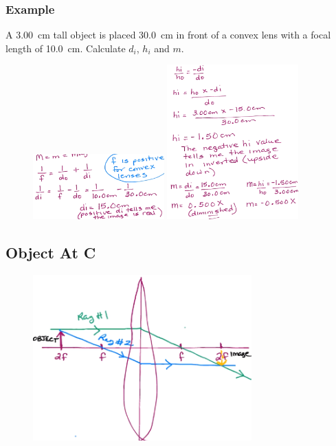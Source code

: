 \documentclass[a4paper,12pt]{article}
\begin{document}
\subsubsection{Example}
A \SI{3.00}{\cm} tall object is placed \SI{30.0}{\cm} in front of a convex lens with a focal length of \SI{10.0}{\cm}. Calculate $d_i$, $h_i$ and $m$.
\begin{figure}[H]
    \centering
    \includegraphics[width=0.45\textwidth]{ex-convex-1}
    \includegraphics[width=0.45\textwidth]{ex-convex-2}
\end{figure}

\pagebreak
\subsection{Object At C}
\begin{figure}[H]
    \centering
    \includegraphics[width=0.75\textwidth]{convex-atc}
\end{figure}
\end{document}
